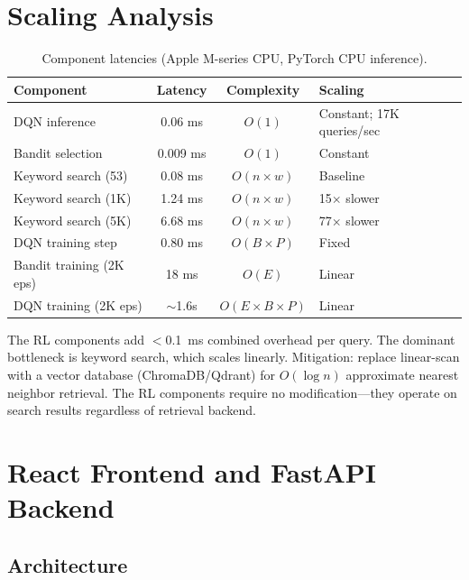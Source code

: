 \documentclass[11pt,letterpaper]{article}
\begin{document}
\section{Scaling Analysis}
\label{sec:scaling}

\begin{table}[H]
\centering
\small
\begin{tabular}{lccp{4.5cm}}
\toprule
\textbf{Component} & \textbf{Latency} & \textbf{Complexity} & \textbf{Scaling} \\
\midrule
DQN inference & 0.06 ms & $O(1)$ & Constant; 17K queries/sec \\
Bandit selection & 0.009 ms & $O(1)$ & Constant \\
Keyword search (53) & 0.08 ms & $O(n \times w)$ & Baseline \\
Keyword search (1K) & 1.24 ms & $O(n \times w)$ & 15$\times$ slower \\
Keyword search (5K) & 6.68 ms & $O(n \times w)$ & 77$\times$ slower \\
DQN training step & 0.80 ms & $O(B \times P)$ & Fixed \\
Bandit training (2K eps) & 18 ms & $O(E)$ & Linear \\
DQN training (2K eps) & $\sim$1.6s & $O(E \times B \times P)$ & Linear \\
\bottomrule
\end{tabular}
\caption{Component latencies (Apple M-series CPU, PyTorch CPU inference).}
\label{tab:scaling}
\end{table}

The RL components add $<$0.1~ms combined overhead per query. The dominant bottleneck is keyword search, which scales linearly. Mitigation: replace linear-scan with a vector database (ChromaDB/Qdrant) for $O(\log n)$ approximate nearest neighbor retrieval. The RL components require no modification---they operate on search results regardless of retrieval backend.

\section{React Frontend and FastAPI Backend}
\label{sec:frontend}

\subsection{Architecture}
\end{document}
